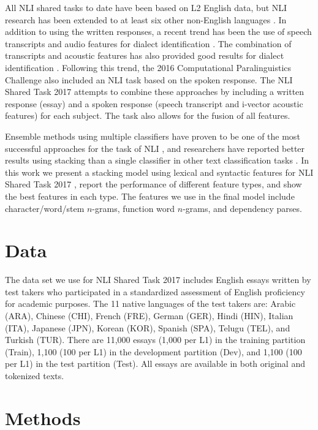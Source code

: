 \documentclass[11pt,letterpaper]{article}
\begin{document}
All NLI shared tasks to date have been based on L2 English data, but NLI research has been extended to at least six other non-English languages \cite{multilingual-nli}. In addition to using the written responses, a recent trend has been the use of speech transcripts and audio features for dialect identification \cite{vardial2016}. The combination of transcripts and acoustic features has also provided good results for dialect identification \cite{vardial2017}. Following this trend, the 2016 Computational Paralinguistics Challenge \cite{compare2016} also included an NLI task based on the spoken response. The NLI Shared Task 2017 attempts to combine these approaches by including a written response (essay) and a spoken response (speech transcript and i-vector acoustic features) for each subject. The task also allows for the fusion of all features.

Ensemble methods using multiple classifiers have proven to be one of the most successful approaches for the task of NLI \cite{malmasi:2017:nlisg}, and researchers have reported better results using stacking than a single classifier in other text classification tasks \citep[e.g.,][]{liu2016}. In this work we present a stacking model using lexical and syntactic features for NLI Shared Task 2017 \cite{nli2017}, report the performance of different feature types, and show the best features in each type. The features we use in the final model include character/word/stem $n$-grams, function word $n$-grams, and dependency parses.

\section{Data}
The data set we use for NLI Shared Task 2017 \citep[see details in][]{nli2017} includes English essays written by test takers who participated in a standardized assessment of English proficiency for academic purposes. The 11 native languages of the test takers are: Arabic (ARA), Chinese (CHI), French (FRE), German (GER), Hindi (HIN), Italian (ITA), Japanese (JPN), Korean (KOR), Spanish (SPA), Telugu (TEL), and Turkish (TUR). There are 11,000 essays (1,000 per L1) in the training partition (Train), 1,100 (100 per L1) in the development partition (Dev), and 1,100 (100 per L1) in the test partition (Test). All essays are available in both original and tokenized texts.

\section{Methods}
\end{document}

